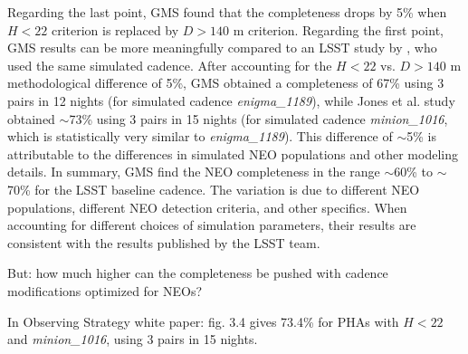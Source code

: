 \documentclass[12pt,preprint]{aastex}
\begin{document}
Regarding the last point, GMS found that the completeness drops by 5\%
when $H<22$ criterion is replaced by $D>140$ m criterion. Regarding 
the first point, GMS results can be more meaningfully compared to an LSST
study by \cite{JJI2016}, who used the same simulated cadence. After accounting for 
the $H<22$ vs. $D>140$ m methodological difference of 5\%, GMS obtained a 
completeness of 67\% using 3 pairs in 12 nights (for simulated cadence {\it enigma\_1189}), while Jones et al. 
study obtained $\sim$73\% using 3 pairs in 15 nights (for simulated cadence {\it minion\_1016}, which is 
statistically very similar to {\it enigma\_1189}). This difference 
of $\sim$5\% is attributable to the differences in simulated NEO
populations and other modeling details. In summary, GMS find the NEO
completeness in the range $\sim$60\% to $\sim$70\% for the LSST
baseline cadence. The variation is due to different NEO populations,
different NEO detection criteria, and other specifics. When accounting 
for different choices of simulation parameters, their results are
consistent with the results published by the LSST team. 

But: how much higher can the completeness be pushed with cadence
modifications optimized for NEOs? 

In Observing Strategy white paper: fig. 3.4 gives 73.4\% for PHAs with 
$H<22$ and {\it minion\_1016}, using 3 pairs in 15 nights. 



\appendix
 


\end{document}
